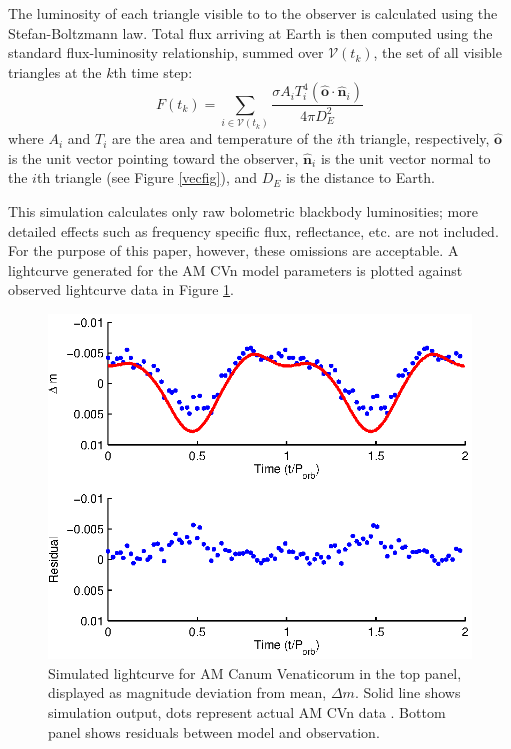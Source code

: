 \documentclass[preprint2]{aastex}
\begin{document}
The luminosity of each triangle visible to to the observer is
calculated using the Stefan-Boltzmann law. Total flux arriving at
Earth is then computed using the standard flux-luminosity
relationship, summed over $\mathcal{V}(t_k)$, the set of all visible
triangles at the $k$th time step:
\begin{equation}
   F(t_k) = \sum_{i \in \mathcal{V}(t_k)} \dfrac{\sigma A_i T_i^4
   (\hat{\textbf{o}} \cdot \hat{\textbf{n}}_i)}{4 \pi D_E^2}
\end{equation}
where $A_i$ and $T_i$ are the area and temperature of the $i$th
triangle, respectively, $\hat{\textbf{o}}$ is the unit vector
pointing toward the observer, $\hat{\textbf{n}}_i$ is the unit vector
normal to the $i$th triangle (see Figure \ref{vecfig}), and $D_E$ is
the distance to Earth.

This simulation calculates only raw bolometric blackbody
luminosities; more detailed effects such as frequency specific flux,
reflectance, etc. are not included. For the purpose of this paper,
however, these omissions are acceptable.  A lightcurve generated for 
the AM CVn model parameters is plotted against observed lightcurve 
data in Figure \ref{fig.LC_output}.

\begin{figure}[t]
  \centering
  \includegraphics[width=\columnwidth]{./figs/amCvn_plus_residuals.eps}
  \caption{Simulated lightcurve for AM Canum Venaticorum in the top panel, displayed as
  magnitude deviation from mean, $\Delta m$. Solid line shows
  simulation output, dots represent actual AM CVn data
  \citep{1998ApJ...493L.105H}. Bottom panel shows residuals between model and observation.}
  \label{fig.LC_output}
\end{figure}
\end{document}
